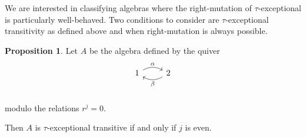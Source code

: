 \documentclass[]{article}
\theoremstyle{definition}
\newtheorem{proposition}{Proposition}[section]
\newcommand{\tu}{\ensuremath{\tau}}
\begin{document}
We are interested in classifying algebras where the right-mutation of \tu-exceptional is particularly well-behaved. Two conditions to consider are \tu-exceptional transitivity as defined above and when right-mutation is always possible.

\begin{proposition}
	Let $A$ be the algebra defined by the quiver
	\[
	\begin{tikzcd}
	1 \arrow[r,bend left,"\alpha"] & 2 \arrow[l,bend left,"\beta"]  \\
	\end{tikzcd}
	\]
	
	modulo the relations $r^j = 0$.
	
	Then $A$ is \tu-exceptional transitive if and only if $j$ is even.
\end{proposition}
\end{document}
